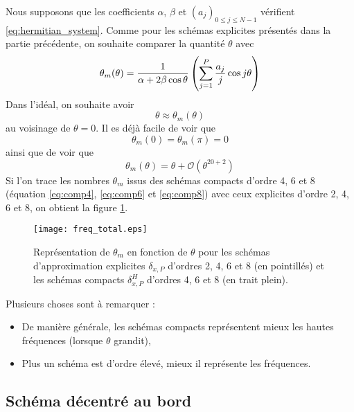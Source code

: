 Nous supposons que les coefficients $\alpha$, $\beta$ et $(a_j)_{0 \leq j \leq N-1}$ vérifient \eqref{eq:hermitian_system}.
Comme pour les schémas explicites présentés dans la partie précédente, on souhaite comparer la quantité $\theta$ avec
\begin{equation}
\theta_m(\theta) = \dfrac{1}{\alpha + 2 \beta \cos \theta} \left( \displaystyle\sum\limits_{j=1}^P \dfrac{a_j}{j} \cos j \theta \right)
\end{equation}
Dans l'idéal, on souhaite avoir 
\begin{equation}
\theta \approx \theta_m(\theta)
\end{equation}
au voisinage de $\theta = 0$. Il es déjà facile de voir que 
\begin{equation}
\theta_m(0) = \theta_m(\pi) = 0
\end{equation}
ainsi que de voir que 
\begin{equation}
\theta_m(\theta) = \theta + \mathcal{O}(\theta^{20+2})
\end{equation}
Si l'on trace les nombres $\theta_m$ issus des schémas compacts d'ordre 4, 6 et 8 (équation \eqref{eq:comp4}, \eqref{eq:comp6} et \eqref{eq:comp8}) avec ceux explicites d'ordre 2, 4, 6 et 8, on obtient la figure \ref{fig:freq_comp}.

\begin{figure}[htbp]
\begin{center}
\texttt{[image: freq\_total.eps]}
\end{center}
\caption{Représentation de $\theta_m$ en fonction de $\theta$ pour les schémas d'approximation explicites $\delta_{x,P}$ d'ordres 2, 4, 6 et 8 (en pointillés) et les schémas compacts $\delta_{x,P}^H$ d'ordres 4, 6 et 8 (en trait plein).}
\label{fig:freq_comp}
\end{figure}
Plusieurs choses sont à remarquer :
\begin{itemize}
\item De manière générale, les schémas compacts représentent mieux les hautes fréquences (lorsque $\theta$ grandit),
\item Plus un schéma est d'ordre élevé, mieux il représente les fréquences.
\end{itemize}














\subsection{Schéma décentré au bord}




























